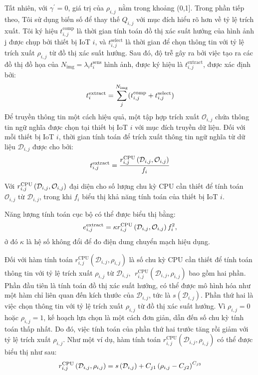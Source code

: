 \documentclass{article} %
\begin{document}
Tất nhiên, với $\gamma^\prime=0$, giá trị của $\rho_{i,j}$ nằm trong khoảng (0,1]. Trong phần tiếp theo, Tôi sử dụng biến số để thay thế $Q_{i,j}$ với mục đích hiểu rõ hơn về tỷ lệ trích xuất.
Tôi ký hiệu $t_{i,j}^{\mathrm{comp}}$ là thời gian tính toán đồ thị xác suất hướng của hình ảnh j được chụp bởi thiết bị IoT $i$, và $t_{i,j}^{\mathrm{select}}$ là thời gian để chọn thông tin với tỷ lệ trích xuất $\rho_{i,j}$ từ đồ thị xác suất hướng. Sau đó, độ trễ gây ra bởi việc tạo ra các đồ thị đồ họa của $N_{\mathrm{img}}=\lambda_it_i^{\mathrm{sens}}$ hình ảnh, được ký hiệu là $t_{i,j}^{\mathrm{extract}}$, được xác định bởi:
\begin{equation}
t^{\rm{extract}}_{i}= \sum_j^{N_{\rm{img}}} (t^{\rm{comp}}_{i, j} + t^{\rm{select}}_{i, j})
\end{equation}
Để truyền thông tin một cách hiệu quả, một tập hợp trích xuất $\mathcal{O}_{i,j}$ chứa thông tin ngữ nghĩa được chọn tại thiết bị IoT $i$ với mục đích truyền dữ liệu. Đối với mỗi thiết bị IoT $i$, thời gian tính toán để trích xuất thông tin ngữ nghĩa từ dữ liệu $\mathcal{D}_{i,j}$ được cho bởi:
\begin{equation}
t^{\rm{extract}}_{i, j}=\frac{r^{\rm{CPU}}_{i, j}\left(\mathcal{D}_{i,j}, \mathcal{O}_{i,j}\right)}{f_{i}}
\end{equation}

Với $r^{\rm{CPU}}_{i, j}\left(\mathcal{D}_{i,j}, \mathcal{O}_{i,j}\right)$ đại diện cho số lượng chu kỳ CPU cần thiết để tính toán $\mathcal{O}_{i,j}$ từ $\mathcal{D}_{i,j}$, trong khi $f_i$ biểu thị khả năng tính toán của thiết bị IoT $i$.

Năng lượng tính toán cục bộ có thể được biểu thị bằng:
\begin{equation}
e^{\rm{extract}}_{i,j}=\kappa r^{\rm{CPU}}_{i, j}\left(\mathcal{D}_{i,j}, \mathcal{O}_{i,j}\right) f_{i}^{2},
\end{equation}
ở đó $\kappa$ là hệ số không đổi để đo điện dung chuyển mạch hiệu dụng.

Đối với hàm tính toán $r_{i,j}^{\mathrm{CPU}}\left(\mathcal{D}_{i,j},\rho_{i,j}\right)$ là số chu kỳ CPU cần thiết để tính toán thông tin với tỷ lệ trích xuất $\rho_{i,j}$ từ $\mathcal{D}_{i,j},\ \ r_{i,j}^{\mathrm{CPU}}\left(\mathcal{D}_{i,j},\rho_{i,j}\right)$ bao gồm hai phần. Phần đầu tiên là tính toán đồ thị xác suất hướng, có thể được mô hình hóa như một hàm chỉ liên quan đến kích thước của $\mathcal{D}_{i,j}$, tức là $s\left(\mathcal{D}_{i,j}\right)$. Phần thứ hai là việc chọn thông tin với tỷ lệ trích xuất $\rho_{i,j}$ từ đồ thị xác suất hướng. Vì $\rho_{i,j}=0$ hoặc $\rho_{i,j}=1$, kế hoạch lựa chọn là một cách đơn giản, dẫn đến số chu kỳ tính toán thấp nhất. Do đó, việc tính toán của phần thứ hai trước tăng rồi giảm với tỷ lệ trích xuất $\rho_{i,j}$. Như một ví dụ, hàm tính toán $r_{i,j}^{\mathrm{CPU}}\left(\mathcal{D}_{i,j},\rho_{i,j}\right)$ có thể được biểu thị như sau:
\begin{equation}
r^{\rm{CPU}}_{i, j}\left(\mathcal{D}_{i,j}, \rho_{i,j}\right)=s\left(\mathcal{D}_{i,j}\right)+C_{j 1}\left(\rho_{i,j}-C_{j2}\right)^{C_{j3}}
\end{equation}
\end{document}
